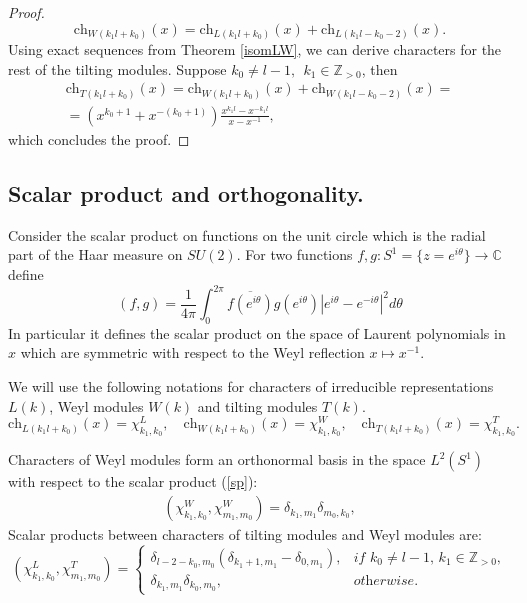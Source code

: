 \documentclass[11pt]{amsart}
\newcommand{\CC}{\mathbb{C}}
\begin{document}
\begin{proof}
	\begin{equation*}
	\mathrm{ch}_{W(k_1l+k_0)}(x)=\mathrm{ch}_{L(k_1l+k_0)}(x)+\mathrm{ch}_{L(k_1l-k_0-2)}(x).
	\end{equation*}
	Using exact sequences from Theorem \ref{isomLW}, we can derive characters for the rest of the tilting modules. Suppose $k_0\neq l-1, \ \ k_1\in\mathbb{Z}_{>0}$, then
	\begin{eqnarray*}
	\mathrm{ch}_{T(k_1l+k_0)}(x)=\mathrm{ch}_{W(k_1l+k_0)}(x)+\mathrm{ch}_{W(k_1l-k_0-2)}(x)=\\
	=(x^{k_0+1}+x^{-(k_0+1)})\frac{x^{k_1l}-x^{-k_1l}}{x-x^{-1}}\nonumber,
	\end{eqnarray*}
	which concludes the proof.
\end{proof}



\subsection{Scalar product and orthogonality.}
Consider the scalar product on functions on the unit circle which is the radial part of the Haar measure on $SU(2)$. For two functions $f, g: S^1=\{z=e^{i\theta}\}\to \CC$ define
\begin{equation}\label{sp}
(f,g)=\frac{1}{4\pi}\int_0^{2\pi}\overline{f(e^{i\theta})}g(e^{i\theta})|e^{i\theta}-e^{-i\theta}|^2d\theta
\end{equation}
In particular it defines the scalar product on the space of Laurent polynomials in $x$ which are symmetric with respect to the Weyl reflection $x\mapsto x^{-1}$.


We will use the following notations for characters of irreducible representations $L(k)$, Weyl modules $W(k)$ and tilting modules $T(k)$.
\begin{equation*}
\mathrm{ch}_{L(k_1l+k_0)}(x)=\chi^L_{k_1,k_0},\quad\mathrm{ch}_{W(k_1l+k_0)}(x)=\chi^W_{k_1,k_0},\quad\mathrm{ch}_{T(k_1l+k_0)}(x)=\chi^T_{k_1,k_0}.
\end{equation*}


Characters of Weyl modules form an orthonormal basis in the space $L^2(S^{1})$ with respect to the scalar product (\ref{sp}):
\begin{eqnarray*}
(\chi^W_{k_1,k_0},\chi^W_{m_1,m_0})=\delta_{k_1,m_1}\delta_{m_0,k_0},
\end{eqnarray*}
Scalar products between characters of tilting modules and Weyl modules are:
\begin{equation*}
(\chi^L_{k_1,k_0},\chi^T_{m_1,m_0})=
\begin{cases}
\delta_{l-2-k_0,m_0}(\delta_{k_1+1,m_1}-\delta_{0,m_1}),& \textit{if $k_0\neq l-1$, $k_1\in\mathbb{Z}_{>0}$},\\
\delta_{k_1,m_1}\delta_{k_0,m_0},& \textit{otherwise}.
\end{cases}
\end{equation*}
\end{document}
